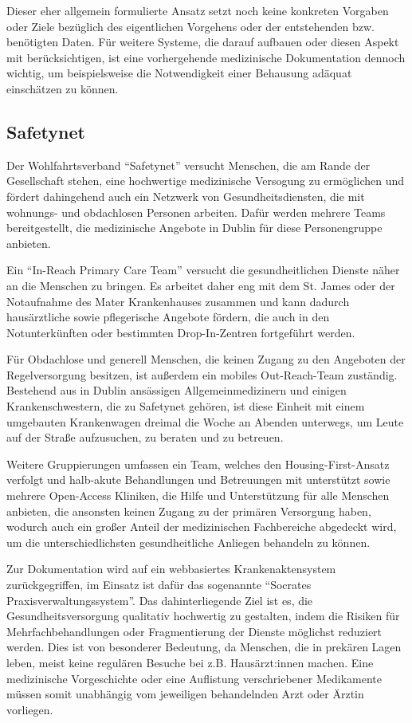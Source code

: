 Dieser eher allgemein formulierte Ansatz setzt noch keine konkreten Vorgaben oder Ziele bezüglich des eigentlichen Vorgehens oder der entstehenden bzw. benötigten Daten. Für weitere Systeme, die darauf aufbauen oder diesen Aspekt mit berücksichtigen, ist eine vorhergehende medizinische Dokumentation dennoch wichtig, um beispielsweise die Notwendigkeit einer Behausung adäquat einschätzen zu können. \citep{Srebnik.2013}

\subsection{Safetynet}

Der Wohlfahrtsverband \enquote{Safetynet} versucht Menschen, die am Rande der Gesellschaft stehen, eine hochwertige medizinische Versogung zu ermöglichen und fördert dahingehend auch ein Netzwerk von Gesundheitsdiensten, die mit wohnungs- und obdachlosen Personen arbeiten. Dafür werden mehrere Teams bereitgestellt, die medizinische Angebote in Dublin für diese Personengruppe anbieten. 

Ein \enquote{In-Reach Primary Care Team} versucht die gesundheitlichen Dienste näher an die Menschen zu bringen. Es arbeitet daher eng mit dem St. James oder der Notaufnahme des Mater Krankenhauses zusammen und kann dadurch hausärztliche sowie pflegerische Angebote fördern, die auch in den Notunterkünften oder bestimmten Drop-In-Zentren fortgeführt werden.

Für Obdachlose und generell Menschen, die keinen Zugang zu den Angeboten der Regelversorgung besitzen, ist außerdem ein mobiles Out-Reach-Team zuständig. Bestehend aus in Dublin ansässigen Allgemeinmedizinern und einigen Krankenschwestern, die zu Safetynet gehören, ist diese Einheit mit einem umgebauten Krankenwagen dreimal die Woche an Abenden unterwegs, um Leute auf der Straße aufzusuchen, zu beraten und zu betreuen.

Weitere Gruppierungen umfassen ein Team, welches den Housing-First-Ansatz verfolgt und halb-akute Behandlungen und Betreuungen mit unterstützt sowie mehrere Open-Access Kliniken, die Hilfe und Unterstützung für alle Menschen anbieten, die ansonsten keinen Zugang zu der primären Versorgung haben, wodurch auch ein großer Anteil der medizinischen Fachbereiche abgedeckt wird, um die unterschiedlichsten gesundheitliche Anliegen behandeln zu können.

Zur Dokumentation wird auf ein webbasiertes Krankenaktensystem zurückgegriffen, im Einsatz ist dafür das sogenannte \enquote{Socrates Praxisverwaltungssystem}. Das dahinterliegende Ziel ist es, die Gesundheitsversorgung qualitativ hochwertig zu gestalten, indem die Risiken für Mehrfachbehandlungen oder Fragmentierung der Dienste möglichst reduziert werden. Dies ist von besonderer Bedeutung, da Menschen, die in prekären Lagen leben, meist keine regulären Besuche bei z.B. Hausärzt:innen machen. Eine medizinische Vorgeschichte oder eine Auflistung verschriebener Medikamente müssen somit unabhängig vom jeweiligen behandelnden Arzt oder Ärztin vorliegen. \citep{Safetynet.2022} \nocite{Safetynet}


